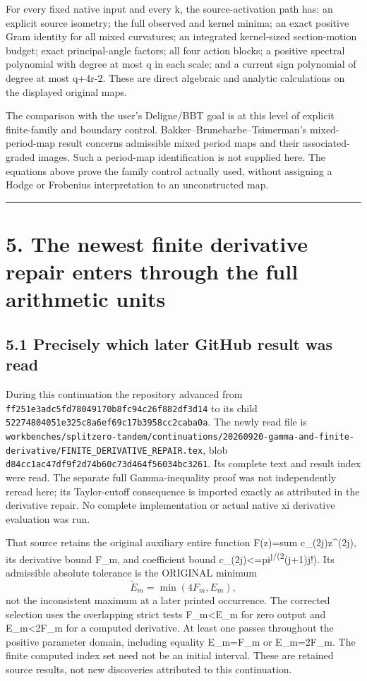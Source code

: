 For every fixed native input and every k, the source-activation path has: an explicit source isometry; the full observed and kernel minima; an exact positive Gram identity for all mixed curvatures; an integrated kernel-sized section-motion budget; exact principal-angle factors; all four action blocks; a positive spectral polynomial with degree at most q in each scale; and a current sign polynomial of degree at most q+4r-2. These are direct algebraic and analytic calculations on the displayed original maps.

The comparison with the user's Deligne/BBT goal is at this level of explicit finite-family and boundary control. Bakker--Brunebarbe--Tsimerman's mixed-period-map result concerns admissible mixed period maps and their associated-graded images. Such a period-map identification is not supplied here. The equations above prove the family control actually used, without assigning a Hodge or Frobenius interpretation to an unconstructed map.

\begin{center}\rule{0.5\linewidth}{0.5pt}\end{center}

\section{5. The newest finite derivative repair enters through the full arithmetic units}\label{the-newest-finite-derivative-repair-enters-through-the-full-arithmetic-units}

\subsection{5.1 Precisely which later GitHub result was read}\label{precisely-which-later-github-result-was-read}

During this continuation the repository advanced from \texttt{ff251e3adc5fd78049170b8fc94c26f882df3d14} to its child \texttt{52274804051e325c8a6ef69c17b3958cc2caba0a}. The newly read file is \texttt{workbenches/splitzero-tandem/continuations/20260920-gamma-and-finite-derivative/FINITE\_DERIVATIVE\_REPAIR.tex}, blob \texttt{d84cc1ac47df9f2d74b60c73d464f56034bc3261}. Its complete text and result index were read. The separate full Gamma-inequality proof was not independently reread here; its Taylor-cutoff consequence is imported exactly as attributed in the derivative repair. No complete implementation or actual native xi derivative evaluation was run.

That source retains the original auxiliary entire function F(z)=sum c\_(2j)z\^{}(2j), its derivative bound F\_m, and coefficient bound \textbar c\_(2j)\textbar\textless=pi\textsuperscript{j/(2}(j+1)j!). Its admissible absolute tolerance is the ORIGINAL minimum \[
 \widetilde E_m=\min(4F_m,E_m),
\] not the inconsistent maximum at a later printed occurrence. The corrected selection uses the overlapping strict tests F\_m\textless E\_m for zero output and E\_m\textless2F\_m for a computed derivative. At least one passes throughout the positive parameter domain, including equality E\_m=F\_m or E\_m=2F\_m. The finite computed index set need not be an initial interval. These are retained source results, not new discoveries attributed to this continuation.

